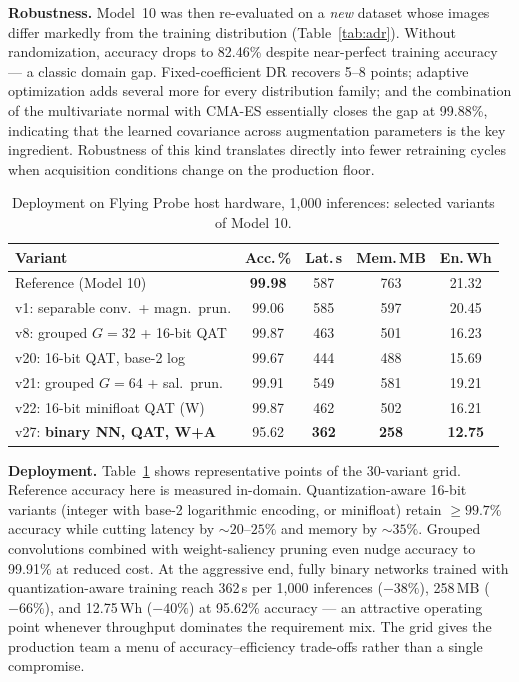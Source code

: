 \documentclass[10pt,twocolumn,a4paper]{article}
\begin{document}
\textbf{Robustness.} Model~10 was then re-evaluated on a \emph{new} dataset whose images differ markedly from the training distribution (Table~\ref{tab:adr}). Without randomization, accuracy drops to 82.46\% despite near-perfect training accuracy --- a classic domain gap. Fixed-coefficient DR recovers 5--8 points; adaptive optimization adds several more for every distribution family; and the combination of the multivariate normal with CMA-ES essentially closes the gap at 99.88\%, indicating that the learned covariance across augmentation parameters is the key ingredient. Robustness of this kind translates directly into fewer retraining cycles when acquisition conditions change on the production floor.

\begin{table}[t]
\centering
\footnotesize
\caption{Deployment on Flying Probe host hardware, 1{,}000 inferences: selected variants of Model 10.}
\label{tab:deploy}
\setlength{\tabcolsep}{2.6pt}
\begin{tabular}{@{}lcccc@{}}
\toprule
Variant & Acc.\,\% & Lat.\,s & Mem.\,MB & En.\,Wh \\
\midrule
Reference (Model 10) & \textbf{99.98} & 587 & 763 & 21.32 \\
v1: separable conv.\ + magn.\ prun. & 99.06 & 585 & 597 & 20.45 \\
v8: grouped $G{=}32$ + 16-bit QAT & 99.87 & 463 & 501 & 16.23 \\
v20: 16-bit QAT, base-2 log & 99.67 & 444 & 488 & 15.69 \\
v21: grouped $G{=}64$ + sal.\ prun. & 99.91 & 549 & 581 & 19.21 \\
v22: 16-bit minifloat QAT (W) & 99.87 & 462 & 502 & 16.21 \\
v27: \textbf{binary NN, QAT, W+A} & 95.62 & \textbf{362} & \textbf{258} & \textbf{12.75} \\
\bottomrule
\end{tabular}
\end{table}

\textbf{Deployment.} Table~\ref{tab:deploy} shows representative points of the 30-variant grid. Reference accuracy here is measured in-domain. Quantization-aware 16-bit variants (integer with base-2 logarithmic encoding, or minifloat) retain ${\geq}99.7\%$ accuracy while cutting latency by ${\sim}20$--$25\%$ and memory by ${\sim}35\%$. Grouped convolutions combined with weight-saliency pruning even nudge accuracy to 99.91\% at reduced cost. At the aggressive end, fully binary networks trained with quantization-aware training reach 362\,s per 1{,}000 inferences (${-}38\%$), 258\,MB (${-}66\%$), and 12.75\,Wh (${-}40\%$) at 95.62\% accuracy --- an attractive operating point whenever throughput dominates the requirement mix. The grid gives the production team a menu of accuracy--efficiency trade-offs rather than a single compromise.
\end{document}
